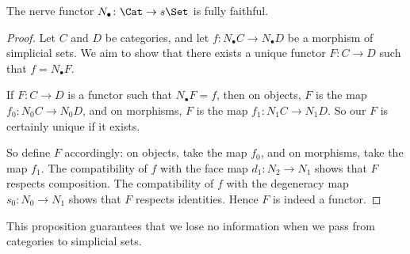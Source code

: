 \begin{proposition}
  The nerve functor $N_\bullet \colon \Cat \to s\Set$ is fully faithful.
\end{proposition}

\begin{proof}
  Let $C$ and $D$ be categories, and let $f \colon N_\bullet C \to N_\bullet D$ be a morphism of simplicial sets.
  We aim to show that there exists a unique functor $F \colon C \to D$ such that $f = N_\bullet F$.

  If $F \colon C \to D$ is a functor such that $N_\bullet F=f$, then
  on objects, $F$ is the map $f_0 \colon N_0C \to N_0D$, and
  on morphisms, $F$ is the map $f_1 \colon N_1C \to N_1D$.
  So our $F$ is certainly unique if it exists.

  So define $F$ accordingly: on objects, take the map $f_0$, and on morphisms, take the map $f_1$.
  The compatibility of $f$ with the face map $d_1 \colon N_2 \to N_1$ shows that $F$ respects composition.
  The compatibility of $f$ with the degeneracy map $s_0 \colon N_0 \to N_1$ shows that $F$ respects identities.
  Hence $F$ is indeed a functor.
\end{proof}

\noindent This proposition guarantees that we lose no information when we pass from categories to simplicial sets.


